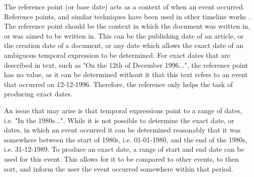 \par The reference point (or base date) acts as a context of when an event occurred. Reference points, and similar techniques have been used in other timeline works \cite{mccloskymanning2012}. The reference point should be the context in which the document was written in, or was aimed to be written in. This can be the publishing date of an article, or the creation date of a document, or any date which allows the exact date of an ambiguous temporal expression to be determined. For exact dates that are described in text, such as "On the 12th of December 1996...", the reference point has no value, as it can be determined without it that this text refers to an event that occurred on 12-12-1996. Therefore, the reference only helps the task of producing exact dates.

\par An issue that may arise is that temporal expressions point to a range of dates, i.e. "In the 1980s...". While it is not possible to determine the exact date, or dates, in which an event occurred it can be determined reasonably \cite{mccloskymanning2012} that it was somewhere between the start of 1980s, i.e. 01-01-1980, and the end of the 1980s, i.e. 31-12-1989. To produce an exact date, a range of start and end date can be used for this event. This allows for it to be compared to other events, to then sort, and inform the user the event occurred somewhere within that period. 


